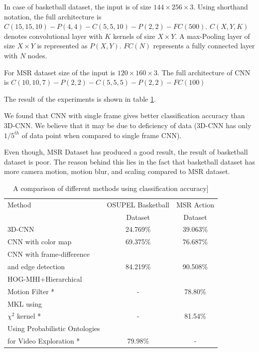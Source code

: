 In case of basketball dataset, the input is of size $144 \times 256 \times 3$. Using shorthand notation, the full architecture is $C(15, 15, 10)-P(4, 4)-C(5, 5, 10)-P(2, 2)-FC(500)$. $C(X, Y, K)$ denotes convolutional layer with $K$ kernels of size $X \times Y$. A max-Pooling layer of size $X \times Y$ is represented as $P(X,Y)$. $FC(N)$ represents a fully connected layer with $N$ nodes. 

For MSR dataset size of the input is $120 \times 160 \times 3$. The full architecture of CNN is $C(10, 10, 7)-P(2, 2)-C(5, 5, 5)-P(2, 2)-FC(100)$

The result of the experiments is shown in table \ref{table:cnn_res}.

We found that CNN with single frame gives better classification accuracy than 3D-CNN. We believe that it may be due to deficiency of data (3D-CNN has only $1/5^{th}$ of data point when compared to single frame CNN).

Even though, MSR Dataset has produced a good result, the result of basketball dataset is poor. The reason behind this lies in the fact that basketball dataset has more camera motion, motion blur, and scaling compared to MSR dataset.


\begin{table}[h]
\caption[A comparison of different methods using classification accuracy]{A comparison of different methods using classification accuracy]}
\label{table:cnn_res}
\centering
\begin{tabular}{|l|c|c|}
\hline
Method & OSUPEL Basketball& MSR Action\\
       & Dataset          &Dataset \\
\hline
\hline
3D-CNN  &24.769\%   &39.063\% \\
\hline
CNN with color map  &69.375\%   &76.687\% \\
\hline
CNN with frame-difference &&\\
and edge detection &84.219\%   &90.508\% \\
\hline
HOG-MHI+Hierarchical &&\\
Motion Filter * \citep{tian2012hierarchical} & -  &78.80\% \\
\hline
MKL using&&\\
$\chi^2$ kernel * \citep{zhao2014feature} & -  &81.54\% \\
\hline
 Using Probabilistic Ontologies&&\\
 for Video Exploration * \citep{bustamante2012using} & 79.98\%   & - \\
\hline  
\end{tabular}
\end{table} 


